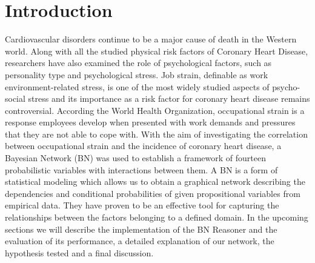\section{Introduction}

Cardiovascular disorders continue to be a major cause of death in the Western world. Along with all the studied physical risk factors of Coronary Heart Disease, researchers have also examined the role of psychological factors, such as personality type and psychological stress. Job strain, definable as work environment-related stress, is one of the most widely studied aspects of psycho-social stress and its importance as a risk factor for coronary heart disease remains controversial. According the World Health Organization, occupational strain is a response employees develop when presented with work demands and pressures that they are not able to cope with.  
With the aim of investigating the correlation between occupational strain and the incidence of coronary heart disease, a Bayesian Network (BN) was used to establish a framework of fourteen probabilistic variables with interactions between them. %
A BN is a form of statistical modeling which allows us to obtain a graphical network describing the dependencies and conditional probabilities of given propositional variables from empirical data. They have proven to be an effective tool for capturing the relationships between the factors belonging to a defined domain. 
In the upcoming sections we will describe the implementation of the BN Reasoner and the evaluation of its performance, a detailed explanation of our network, the hypothesis tested and a final discussion. 
